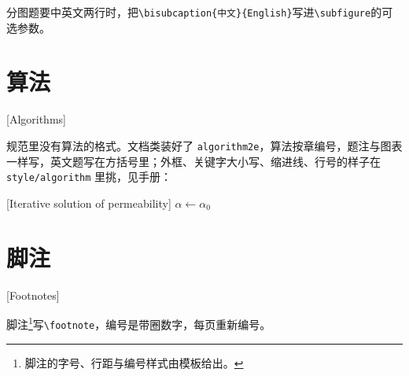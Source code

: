 分图题要中英文两行时，把\verb|\bisubcaption{中文}{English}|写进\verb|\subfigure|的可选参数。

\section{算法}[Algorithms]

规范里没有算法的格式。文档类装好了 \verb|algorithm2e|，算法按章编号，题注与图表一样写，英文题写在方括号里；外框、关键字大小写、缩进线、行号的样子在 \verb|style/algorithm| 里挑，见手册：

\begin{algorithm}[!ht]
  \caption{渗透率的迭代求解}[Iterative solution of permeability]
  $\alpha \gets \alpha_0$\;
  \Return{$\alpha$}
\end{algorithm}

\section{脚注}[Footnotes]

脚注\footnote{脚注的字号、行距与编号样式由模板给出。}写\verb|\footnote|，编号是带圈数字，每页重新编号。
